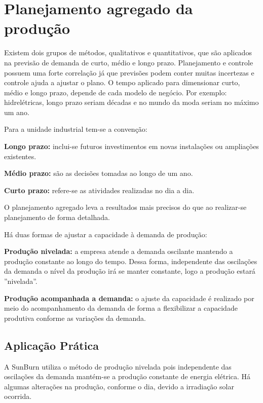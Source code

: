 \chapter{Planejamento agregado da produção} 
\label{chap:planejamento_agregado} 

Existem dois grupos de métodos, qualitativos e quantitativos, que são aplicados na previsão de demanda de curto, médio e longo prazo.
Planejamento e controle possuem uma forte correlação já que previsões podem conter muitas incertezas e controle ajuda a ajustar o plano.
O tempo aplicado para dimensionar curto, médio e longo prazo, depende de cada modelo de negócio. Por exemplo: hidrelétricas, longo prazo seriam décadas e no mundo da moda seriam no máximo um ano.

Para a unidade industrial tem-se a convenção:

\textbf{Longo prazo:} inclui-se futuros investimentos em novas instalações ou ampliações existentes.

\textbf{Médio prazo:} são as decisões tomadas ao longo de um ano.

\textbf{Curto prazo:} refere-se as atividades realizadas no dia a dia.

O planejamento agregado leva a resultados mais precisos do que ao realizar-se planejamento de forma detalhada.

Há duas formas de ajustar a capacidade à demanda de produção:

\textbf{Produção nivelada:} a empresa atende a demanda oscilante mantendo a produção constante ao longo do tempo. Dessa forma, independente das oscilações da demanda o nível da produção irá se manter constante, logo a produção estará ''nivelada''. 

\textbf{Produção acompanhada a demanda:} o ajuste da capacidade é realizado por meio do acompanhamento da demanda de forma a flexibilizar a capacidade produtiva conforme as variações da demanda.


\section{Aplicação Prática} 
\label{sec:planejamento_agregado_aplicacao}

A SunBurn utiliza o método de produção nivelada pois independente das oscilações da demanda mantém-se a produção constante de energia elétrica. Há algumas alterações na produção, conforme o dia, devido a irradiação solar ocorrida.
